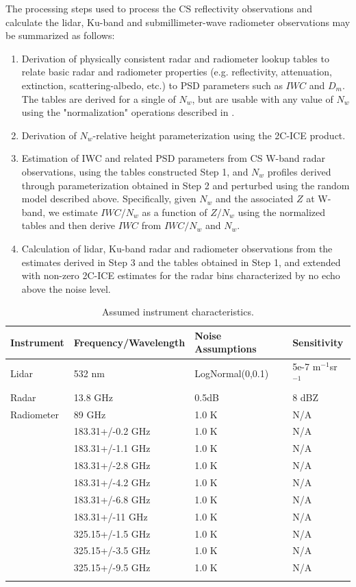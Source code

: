 \documentclass{ametsocV6.1}
\begin{document}
The processing steps used to process the CS reflectivity observations and calculate the lidar, Ku-band and 
submillimeter-wave radiometer observations may be summarized as follows:
\begin{enumerate}
\item Derivation of physically consistent radar and radiometer lookup tables to relate basic radar and 
radiometer properties (e.g. reflectivity, attenuation, extinction, scattering-albedo, etc.) to PSD parameters 
such as $IWC$ and $D_m$. The tables are derived for a single of $N_w$, but are usable with any value of 
$N_w$ using the "normalization" operations described in \citep{grecu2011}.
\item Derivation of $N_w$-relative height parameterization using the 2C-ICE product.
\item Estimation of IWC and related PSD parameters from CS W-band radar observations, using the tables 
constructed Step 1, and $N_w$ profiles derived through parameterization obtained in Step 2 and perturbed using the random model 
described above. Specifically, given $N_w$ and the associated $Z$ at W-band, we estimate $IWC/N_w$ as a function of $Z/N_w$ using the
normalized tables and then derive $IWC$ from $IWC/N_w$ and $N_w$.
\item Calculation of lidar, Ku-band radar and radiometer observations from the estimates derived in Step 3 
and the tables obtained in Step 1, and extended with non-zero 2C-ICE estimates for the radar bins characterized by no echo
above the noise level.
\end{enumerate}

\begin{table}
    \caption{Assumed instrument characteristics.}\label{t_sensors}
    \begin{center}
    \begin{tabular}{llll}

    Instrument & Frequency/Wavelength & Noise Assumptions& Sensitivity \\
    \hline
    Lidar & 532 nm & LogNormal(0,0.1) & 5e-7 m$^{-1}$sr$^{-1}$ \\
    \hline
    Radar & 13.8 GHz & 0.5dB & 8 dBZ \\
    \hline
    Radiometer & 89 GHz & 1.0 K & N/A \\
    & 183.31+/-0.2 GHz & 1.0 K & N/A \\
    & 183.31+/-1.1 GHz & 1.0 K & N/A \\
    & 183.31+/-2.8 GHz & 1.0 K & N/A \\
    & 183.31+/-4.2 GHz & 1.0 K & N/A \\
    & 183.31+/-6.8 GHz & 1.0 K & N/A \\
    & 183.31+/-11 GHz & 1.0 K & N/A \\
    & 325.15+/-1.5 GHz & 1.0 K & N/A \\
    & 325.15+/-3.5 GHz & 1.0 K & N/A \\
    & 325.15+/-9.5 GHz & 1.0 K & N/A \\
   \hline \\
    
    \end{tabular}
\end{center}
\end{table}
\end{document}
